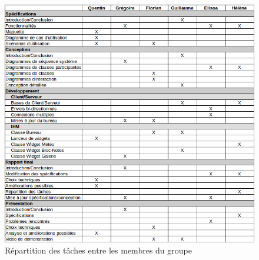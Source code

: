 \begin{center}
	\begin{figure}
		\includegraphics[scale=0.65]{resources/repartition.png}
		\caption{Répartition des tâches entre les membres du groupe}
	\end{figure}
\end{center}